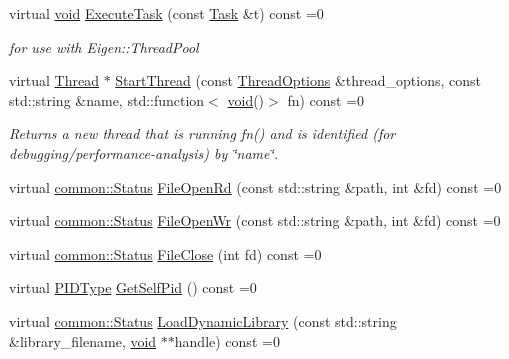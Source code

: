 \begin{DoxyCompactItemize}
virtual \mbox{\hyperlink{mlasi_8h_a88f941d423cb2a819b70a1358982b1a6}{void}} \mbox{\hyperlink{classonnxruntime_1_1Env_a1270e73cbc0c76b8fc17c71623c065ec}{Execute\+Task}} (const \mbox{\hyperlink{structonnxruntime_1_1Env_1_1Task}{Task}} \&t) const =0
\begin{DoxyCompactList}\small\item\em for use with Eigen\+::\+Thread\+Pool \end{DoxyCompactList}\item 
virtual \mbox{\hyperlink{classonnxruntime_1_1Thread}{Thread}} $\ast$ \mbox{\hyperlink{classonnxruntime_1_1Env_a3c31e79c5ef19deafbaa10142aa4610e}{Start\+Thread}} (const \mbox{\hyperlink{structonnxruntime_1_1ThreadOptions}{Thread\+Options}} \&thread\+\_\+options, const std\+::string \&name, std\+::function$<$ \mbox{\hyperlink{mlasi_8h_a88f941d423cb2a819b70a1358982b1a6}{void}}()$>$ fn) const =0
\begin{DoxyCompactList}\small\item\em Returns a new thread that is running fn() and is identified (for debugging/performance-\/analysis) by \char`\"{}name\char`\"{}. \end{DoxyCompactList}\item 
virtual \mbox{\hyperlink{classonnxruntime_1_1common_1_1Status}{common\+::\+Status}} \mbox{\hyperlink{classonnxruntime_1_1Env_aa0c0ce6e07920d1acd1794cff15d0577}{File\+Open\+Rd}} (const std\+::string \&path, int \&fd) const =0
\item 
virtual \mbox{\hyperlink{classonnxruntime_1_1common_1_1Status}{common\+::\+Status}} \mbox{\hyperlink{classonnxruntime_1_1Env_a3a4b5c4983f2fe3f8fad18dcc8c44f1f}{File\+Open\+Wr}} (const std\+::string \&path, int \&fd) const =0
\item 
virtual \mbox{\hyperlink{classonnxruntime_1_1common_1_1Status}{common\+::\+Status}} \mbox{\hyperlink{classonnxruntime_1_1Env_aba47acf27bb87a6e5710e45b20e0fc4c}{File\+Close}} (int fd) const =0
\item 
virtual \mbox{\hyperlink{namespaceonnxruntime_ab899e71c070d3fe82ae09bb53075b258}{P\+I\+D\+Type}} \mbox{\hyperlink{classonnxruntime_1_1Env_a1b78c553e28b5d996655d81bb447c84d}{Get\+Self\+Pid}} () const =0
\item 
virtual \mbox{\hyperlink{classonnxruntime_1_1common_1_1Status}{common\+::\+Status}} \mbox{\hyperlink{classonnxruntime_1_1Env_abc3cc65bf355845671d84421f0a00765}{Load\+Dynamic\+Library}} (const std\+::string \&library\+\_\+filename, \mbox{\hyperlink{mlasi_8h_a88f941d423cb2a819b70a1358982b1a6}{void}} $\ast$$\ast$handle) const =0
$$
\end{DoxyCompactItemize}
